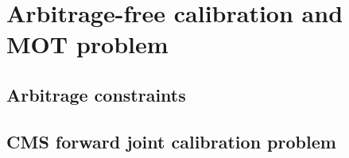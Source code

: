 \chapter{Arbitrage-free calibration and MOT problem}
\section{Arbitrage constraints}






\section{CMS forward joint calibration problem}

\begin{comment}
    \chapter{Theoretical analysis and methodology }
\section{Problem Formulation}
	Let's familiarize ourselves with some fundamental notions related to an American option with maturity $T>0$, which can be exercised at any time $t \in (0,T]$. For this purpose, we consider a filtered probability space denoted by $(\Omega,\mathcal{F},\mathbb{F},\mathbb{Q}^{T_{n}})$, where $\mathbb{F}$ represents the augmented filtration of a d-dimensional Brownian motion $(W_{t})_{t\in [0,T]}$, and $\mathbb{Q}$ denotes the risk-neutral probability measure while $\mathbb{Q}^{T_{n}}$ used to represent the forward measure. Furthermore, we introduce $(\beta_{t})_{t}$, which signifies the value of a risk-free account at time $t$. Typically, this value corresponds to that of bank deposits, while in the context of interest rate products, it equates to the value of zero-coupon bonds. Additionally, we utilize $(X_{t})_{t}$ to denote the underlying process or the diffusion process, particularly relevant in the interest rate product scenario. Moreover, we define $(Z_{t})_{t}$ as the $\mathbb{F}$-adapted, right-continuous payoff process of the option, satisfying condition $\mathbb{E}[\sup_{t\in[0,T]}Z_{t}] < \infty$.
	
	Introducing $\tau$ as a stopping time and $\mathcal{T}$ as the set of all stopping times with respect to the filtration $\mathbb{F}$, we can express the value of the American option at time $t$ as shown in equation $$V_{t} = \text{ess sup}_{\tau \in \mathcal{T},\tau \geq t}\mathbb{E}[\beta_{t}\frac{Z_{\tau}}{\beta_{\tau}}|\mathcal{F}_{t}].$$ Notably, the price of the American option corresponds to its value at initial time $t_{0}$, as shown in equation $$V_{0}=\sup_{\tau \in \mathcal{T}}\beta_{0}\mathbb{E}[\frac{Z_{\tau}}{\beta_{\tau}}]\quad \text{(Primal Form)}.$$
	

\end{comment}
